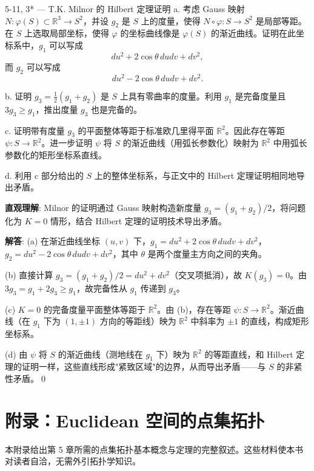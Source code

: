 \begin{Remark}
\begin{exercise}{5-11, 3* — T.K. Milnor 的 Hilbert 定理证明}
a. 考虑 Gauss 映射 $N \colon \varphi(S) \subset \mathbb{R}^3 \to S^2$，并设 $g_2$ 是 $S$ 上的度量，使得 $N \circ \varphi \colon S \to S^2$ 是局部等距。在 $S$ 上选取局部坐标，使得 $\varphi$ 的坐标曲线像是 $\varphi(S)$ 的渐近曲线。证明在此坐标系中，$g_1$ 可以写成
\[
du^2 + 2\cos\theta\,dudv + dv^2,
\]
而 $g_2$ 可以写成
\[
du^2 - 2\cos\theta\,dudv + dv^2.
\]

b. 证明 $g_3 = \frac{1}{2}(g_1 + g_2)$ 是 $S$ 上具有零曲率的度量。利用 $g_1$ 是完备度量且 $3g_3 \geq g_1$，推出度量 $g_3$ 也是完备的。

c. 证明带有度量 $g_3$ 的平面整体等距于标准欧几里得平面 $\mathbb{R}^2$。因此存在等距 $\psi \colon S \to \mathbb{R}^2$。进一步证明 $\psi$ 将 $S$ 的渐近曲线（用弧长参数化）映射为 $\mathbb{R}^2$ 中用弧长参数化的矩形坐标系直线。

d. 利用 c 部分给出的 $S$ 上的整体坐标系，与正文中的 Hilbert 定理证明相同地导出矛盾。
\end{exercise}
\begin{solution}
\textbf{直观理解}: Milnor 的证明通过 Gauss 映射构造新度量 $g_3=(g_1+g_2)/2$，将问题化为 $K=0$ 情形，结合 Hilbert 定理的证明技术导出矛盾。

\textbf{解答}: (a) 在渐近曲线坐标 $(u,v)$ 下，$g_1=du^2+2\cos\theta\,dudv+dv^2$，$g_2=du^2-2\cos\theta\,dudv+dv^2$，其中 $\theta$ 是两个度量主方向之间的夹角。

(b) 直接计算 $g_3=(g_1+g_2)/2=du^2+dv^2$（交叉项抵消），故 $K(g_3)=0$。由 $3g_3=g_1+2g_3\geq g_1$，故完备性从 $g_1$ 传递到 $g_3$。

(c) $K=0$ 的完备度量平面整体等距于 $\mathbb{R}^2$。由 (b)，存在等距 $\psi: S\to\mathbb{R}^2$。渐近曲线（在 $g_1$ 下为 $(1,\pm 1)$ 方向的等距线）映为 $\mathbb{R}^2$ 中斜率为 $\pm 1$ 的直线，构成矩形坐标系。

(d) 由 $\psi$ 将 $S$ 的渐近曲线（测地线在 $g_1$ 下）映为 $\mathbb{R}^2$ 的等距直线，和 Hilbert 定理的证明一样，这些直线形成"紧致区域"的边界，从而导出矛盾——与 $S$ 的非紧性矛盾。\qed
\end{solution}

\appendix
\chapter{附录：Euclidean 空间的点集拓扑}\label{chap:topology-appendix}

本附录给出第 5 章所需的点集拓扑基本概念与定理的完整叙述。这些材料使本书对读者自洽，无需外引拓扑学知识。


\end{Remark}
